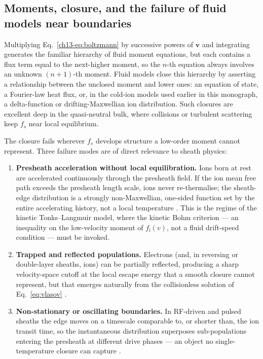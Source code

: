 \subsection{Moments, closure, and the failure of fluid models near boundaries}

Multiplying Eq.~\eqref{ch13-eq:boltzmann} by successive powers of $\mathbf{v}$ and integrating generates the familiar hierarchy of fluid moment equations, but each contains a flux term equal to the next-higher moment, so the $n$-th equation always involves an unknown $(n+1)$-th moment. Fluid models close this hierarchy by asserting a relationship between the unclosed moment and lower ones: an equation of state, a Fourier-law heat flux, or, in the cold-ion models used earlier in this monograph, a delta-function or drifting-Maxwellian ion distribution. Such closures are excellent deep in the quasi-neutral bulk, where collisions or turbulent scattering keep $f_{s}$ near local equilibrium.

The closure fails wherever $f_s$ develops structure a low-order moment cannot represent. Three failure modes are of direct relevance to sheath physics:

\begin{enumerate}
\item \textbf{Presheath acceleration without local equilibration.} Ions born at rest are accelerated continuously through the presheath field. If the ion mean free path exceeds the presheath length scale, ions never re-thermalise; the sheath-edge distribution is a strongly non-Maxwellian, one-sided function set by the entire accelerating history, not a local temperature \cite{ref0665,ref0666,ref0659}. This is the regime of the kinetic Tonks--Langmuir model, where the kinetic Bohm criterion --- an inequality on the low-velocity moment of $f_{\mathrm{i}}(v)$, not a fluid drift-speed condition --- must be invoked.
\item \textbf{Trapped and reflected populations.} Electrons (and, in reversing or double-layer sheaths, ions) can be partially reflected, producing a sharp velocity-space cutoff at the local escape energy that a smooth closure cannot represent, but that emerges naturally from the collisionless solution of Eq.~\eqref{eq:vlasov} \cite{ref0670}.
\item \textbf{Non-stationary or oscillating boundaries.} In RF-driven and pulsed sheaths the edge moves on a timescale comparable to, or shorter than, the ion transit time, so the instantaneous distribution superposes sub-populations entering the presheath at different drive phases --- an object no single-temperature closure can capture \cite{ref0637}.
\end{enumerate}

